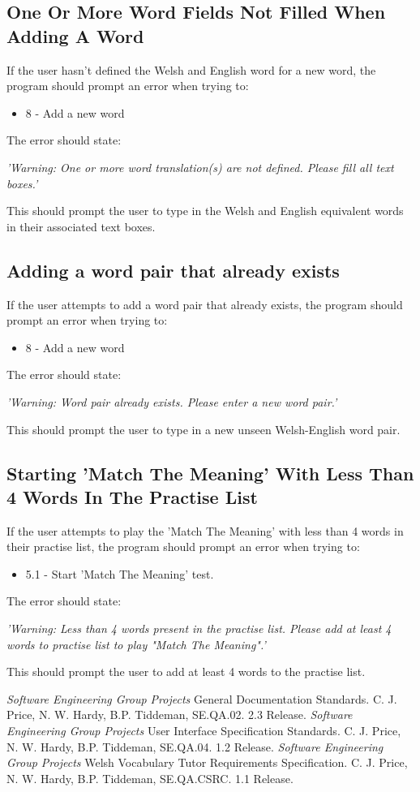 \documentclass{project}
\begin{document}
\subsection{One Or More Word Fields Not Filled When Adding A Word}
If the user hasn't defined the Welsh and English word for a new word, the program should prompt an error when trying to:
\begin{itemize}
	\item 8 - Add a new word
	\end{itemize}
The error should state:
\begin{center}
	\emph{'Warning: One or more word translation(s) are not defined. Please fill all text boxes.'}
\end{center}
This should prompt the user to type in the Welsh and English equivalent words in their associated text boxes.
\subsection{Adding a word pair that already exists}
If the user attempts to add a word pair that already exists, the program should prompt an error when trying to:
\begin{itemize}
	\item 8 - Add a new word
	\end{itemize}
The error should state:
\begin{center}
	\emph{'Warning: Word pair already exists. Please enter a new word pair.'}
\end{center}
This should prompt the user to type in a new unseen Welsh-English word pair.
\subsection{Starting 'Match The Meaning' With Less Than 4 Words In The Practise List}
If the user attempts to play the 'Match The Meaning' with less than 4 words in their practise list, the program should prompt an error when trying to:
\begin{itemize}
	\item 5.1 - Start 'Match The Meaning' test.
	\end{itemize}
The error should state:
\begin{center}
	\emph{'Warning: Less than 4 words present in the practise list. Please add at least 4 words to practise list to play "Match The Meaning".'}
\end{center}
This should prompt the user to add at least 4 words to the practise list.
\begin{thebibliography}{5}
 \emph{Software Engineering Group Projects}
General Documentation Standards.
C. J. Price, N. W. Hardy, B.P. Tiddeman, SE.QA.02. 2.3 Release.
 \emph{Software Engineering Group Projects}
User Interface Specification Standards.
C. J. Price, N. W. Hardy, B.P. Tiddeman, SE.QA.04. 1.2 Release.
 \emph{Software Engineering Group Projects}
Welsh Vocabulary Tutor Requirements Specification.
C. J. Price, N. W. Hardy, B.P. Tiddeman, SE.QA.CSRC. 1.1 Release.
\end{thebibliography}
\end{document}
